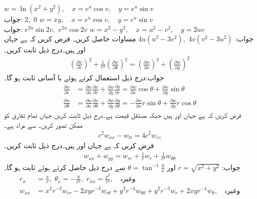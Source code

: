 \quad
$w=\ln(x^2+y^2),\quad x=e^u\cos v,\quad y=e^u\sin v$\\
جواب:
$2,\,\, 0$
\quad
$w=xy,\quad x=e^u\cos v,\quad y=e^u\sin v$\\
جواب:
$e^{2u}\sin 2v,\,\,e^{2u}\cos 2v$
\quad
$w=x^2-y^2,\quad x=u^2-v^2,\quad y=2uv$\\
جواب:
$4u(u^2-3v^2),\,\,4v(v^2-3u^2)$
مساوات  حاصل کریں۔
فرض کریں کہ  ہے جہاں  اور  ہیں۔درج ذیل ثابت کریں۔
\begin{align*}
\left(\frac{\partial w}{\partial r}\right)^2+\frac{1}{r^2}\left(\frac{\partial w}{\partial \theta}\right)^2=\left(\frac{\partial w}{\partial x}\right)^2+\left(\frac{\partial w}{\partial y}\right)^2
\end{align*}
جواب:درج ذیل استعمال کرتے ہوئے با آسانی ثابت ہو گا۔
\begin{align*}
\frac{\partial w}{\partial r}&=\frac{\partial w}{\partial x}\frac{\partial x}{\partial r}+\frac{\partial w}{\partial y}\frac{\partial y}{\partial r}=
\frac{\partial w}{\partial x}\cos \theta +\frac{\partial w}{\partial y}\sin \theta \\
\frac{\partial w}{\partial \theta}&=\frac{\partial w}{\partial x}\frac{\partial x}{\partial \theta}+\frac{\partial w}{\partial y}\frac{\partial y}{\partial \theta}=
-\frac{\partial w}{\partial x}r\sin \theta +\frac{\partial w}{\partial y}r\cos\theta 
\end{align*}
فرض کریں کہ ہے جہاں   اور   ہیں جبکہ   مستقل قیمت  ہے۔درج ذیل ثابت کریں جہاں تمام تفارق کو ممکن تصور کریں۔  سے مراد  ہے۔
\begin{align*}
c^2w_{xx}-w_{tt}=4c^2w_{vz}
\end{align*} 
فرض کریں کہ  ہے جہاں  اور  ہیں۔درج ذیل ثابت کریں۔
\begin{align*}
w_{xx}+w_{yy}=w_{rr}+\frac{1}{r}w_r+\frac{1}{r^2}w_{\theta \theta}
\end{align*}
جواب:
$r=\sqrt{x^2+y^2}$
اور
$\theta=\tan^{-1}\frac{y}{x}$
سے درج ذیل حاصل کرتے ہوئے ثابت ہو گا۔
\begin{align*}
r_x&=\frac{x}{r},\,\, \theta_x=-\frac{y}{r^2},\,\, r_{xx}=\frac{y^2}{r^3},\quad \text{وغیرہ}\\
 w_{xx}&=x^2r^{-2}w_{rr}-2xyr^{-3}w_{r\theta}+y^2r^{-4}w_{\theta\theta}+y^2r^{-3}w_r+2xyr^{-4}w_{\theta},\quad \text{وغیرہ}
\end{align*}

